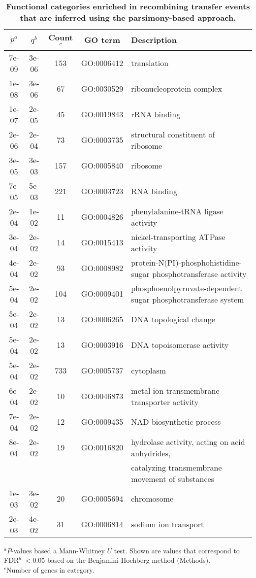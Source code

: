 \documentclass[12pt]{article}
\begin{document}
\begin{table}[!ht]
\caption{
{\bf Functional categories enriched in 
recombining transfer events that are inferred using the parsimony-based
approach.}}
\noindent \begin{centering}
\begin{tabular}{ccccl}
\hline 
$p^a$ & $q^b$ & Count$^c$ & GO term & Description \\
\hline 
7e-09 & 3e-06 & 153 & GO:0006412 & translation\\
1e-08 & 3e-06 & 67 & GO:0030529 & ribonucleoprotein complex\\
1e-07 & 2e-05 & 45 & GO:0019843 & rRNA binding\\
2e-06 & 2e-04 & 73 & GO:0003735 & structural constituent of ribosome\\
3e-05 & 3e-03 & 157 & GO:0005840 & ribosome\\
7e-05 & 5e-03 & 221 & GO:0003723 & RNA binding\\
2e-04 & 1e-02 & 11 & GO:0004826 & phenylalanine-tRNA ligase activity\\
3e-04 & 2e-02 & 14 & GO:0015413 & nickel-transporting ATPase activity\\
4e-04 & 2e-02 & 93 & GO:0008982 & protein-N(PI)-phosphohistidine-sugar phosphotransferase activity\\
5e-04 & 2e-02 & 104 & GO:0009401 & phosphoenolpyruvate-dependent sugar phosphotransferase system\\
5e-04 & 2e-02 & 13 & GO:0006265 & DNA topological change\\
5e-04 & 2e-02 & 13 & GO:0003916 & DNA topoisomerase activity\\
5e-04 & 2e-02 & 733 & GO:0005737 & cytoplasm\\
6e-04 & 2e-02 & 10 & GO:0046873 & metal ion transmembrane transporter activity\\
7e-04 & 2e-02 & 12 & GO:0009435 & NAD biosynthetic process\\
8e-04 & 2e-02 & 19 & GO:0016820 & hydrolase activity, acting on acid anhydrides, \\
      &       &    &       &catalyzing transmembrane movement of substances \\
1e-03 & 3e-02 & 20 & GO:0005694 & chromosome\\
2e-03 & 4e-02 & 31 & GO:0006814 & sodium ion transport\\
\hline 
\end{tabular}
\par\end{centering}
\begin{flushleft}
$^a$$P$-values based a Mann-Whitney $U$ test.  Shown are values that
correspond to FDR$^b$  $<0.05$ based on the 
Benjamini-Hochberg method (Methods).\\
$^c$Number of genes in category.\\
\end{flushleft}
\label{tab:go-events-recombining}
\end{table}
\clearpage{}
\end{document}
